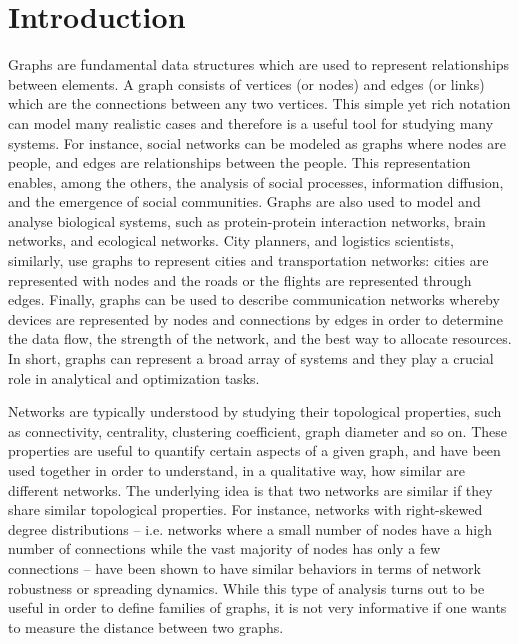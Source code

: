 \documentclass[../Thesis.tex]{subfiles}
\begin{document}
	\chapter{Introduction}
	\label{sec:introduction}
	
	Graphs are fundamental data structures which are used to represent relationships between elements. A graph consists of vertices (or nodes) and edges (or links) which are the connections between any two vertices. This simple yet rich notation can model many realistic cases and therefore is a useful tool for studying many systems. For instance, social networks can be modeled as graphs where nodes are people, and edges are relationships between the people. This representation enables, among the others, the analysis of social processes, information diffusion, and the emergence of social communities. Graphs are also used to model and analyse biological systems, such as protein-protein interaction networks, brain networks, and ecological networks. City planners, and logistics scientists, similarly, use graphs to represent cities and transportation networks: cities are represented with nodes and the roads or the flights are represented through edges. Finally, graphs can be used to describe communication networks whereby devices are represented by nodes and connections by edges in order to determine the data flow, the strength of the network, and the best way to allocate resources. In short, graphs can represent a broad array of systems and they play a crucial role in analytical and optimization tasks.
	
	Networks are typically understood by studying their topological properties, such as connectivity, centrality, clustering coefficient, graph diameter and so on. These properties are useful to quantify certain aspects of a given graph, and have been used together in order to understand, in a qualitative way, how similar are different networks. The underlying idea is that two networks are similar if they share similar topological properties. For instance, networks with right-skewed degree distributions -- i.e. networks where a small number of nodes have a high number of connections while the vast majority of nodes has only a few connections -- have been shown to have similar behaviors in terms of network robustness or spreading dynamics\cite{albert2002statistical, pastor2001epidemic}. While this type of analysis turns out to be useful in order to define families of graphs, it is not very informative if one wants to measure the distance between two graphs.
	
\end{document}
